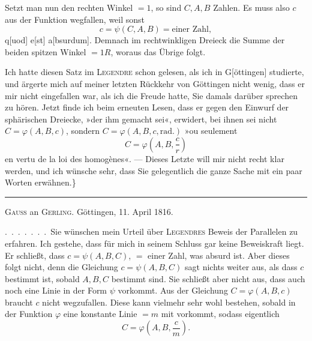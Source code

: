 \begin{center}\end{center}
\noindent Setzt man nun den rechten Winkel $=1$, so sind $C,A,B$ Zahlen. Es muss also $c$ aus der Funktion wegfallen, weil sonst
\[
c=\psi(C,A,B)=\text{einer Zahl},
\]
q[uod] e[st] a[bsurdum]. Demnach im rechtwinkligen Dreieck die Summe der beiden spitzen Winkel $=1R$, woraus das Übrige folgt.

Ich hatte diesen Satz im \textsc{Legendre} schon gelesen, als ich in G[öttingen] studierte, und ärgerte mich auf meiner letzten Rückkehr von Göttingen nicht wenig, dass er mir nicht eingefallen war, als ich die Freude hatte, Sie damals darüber sprechen zu hören. Jetzt finde ich beim erneuten Lesen, dass er gegen den Einwurf der sphärischen Dreiecke, »der ihm gemacht sei«, erwidert, bei ihnen sei nicht $C=\varphi(A,B,c)$, sondern $C=\varphi(A,B,c,\mathrm{rad.})$ »ou seulement
\[
C=\varphi\!\left(A,B,\frac{c}{r}\right)
\]
en vertu de la loi des homogènes«. --- Dieses Letzte will mir nicht recht klar werden, und ich wünsche sehr, dass Sie gelegentlich die ganze Sache mit ein paar Worten erwähnen.\}

\begin{center}\rule{3cm}{0.4pt}\end{center}
\begin{center}\textsc{Gauss} an \textsc{Gerling}. Göttingen, 11. April 1816.\end{center}

.\ .\ .\ .\ .\ .\ .\ Sie wünschen mein Urteil über \textsc{Legendres} Beweis der Parallelen zu erfahren. Ich gestehe, dass für mich in seinem Schluss gar keine Beweiskraft liegt. Er schließt, dass $c=\psi(A,B,C)$,  $=$ einer Zahl, was absurd ist. Aber dieses  folgt nicht, denn die Gleichung $c=\psi(A,B,C)$ sagt nichts weiter aus, als dass $c$ bestimmt ist, sobald $A,B,C$ bestimmt sind. Sie schließt aber nicht aus, dass auch noch eine  Linie in der Form $\psi$ vorkommt. Aus der Gleichung $C=\varphi(A,B,c)$ braucht $c$ nicht wegzufallen. Diese kann vielmehr sehr wohl bestehen, sobald in der Funktion $\varphi$ eine konstante Linie $=m$ mit vorkommt, sodass eigentlich
\[
C=\varphi\!\left(A,B,\frac{c}{m}\right).
\]
